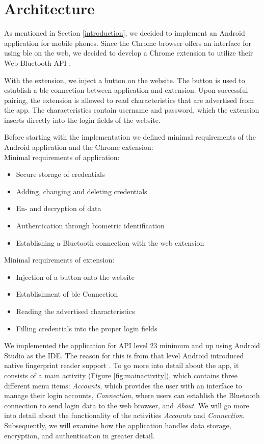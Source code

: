 \section{Architecture} \label{architecture}
As mentioned in Section \ref{introduction}, we decided to implement an Android application for mobile phones. Since the Chrome browser offers an interface for using \gls{ble} on the web, we decided to develop a Chrome extension to utilize their Web Bluetooth API \cite{WebBTAPI}.

With the extension, we inject a button on the website. The button is used to establish a \gls{ble} connection between application and extension. Upon successful pairing, the extension is allowed to read characteristics that are advertised from the app. The characteristics contain username and password, which the extension inserts directly into the login fields of the website.

\noindent Before starting with the implementation we defined minimal requirements of the Android application and the Chrome extension: \\

\noindent Minimal requirements of application:
\begin{itemize}
\item Secure storage of credentials
\item Adding, changing and deleting credentials
\item En- and decryption of data 
\item Authentication through biometric identification
\item Establishing a Bluetooth connection with the web extension
\end{itemize}
\vspace{0.3cm}
\noindent Minimal requirements of extension:
\begin{itemize}
\item Injection of a button onto the website
\item Establishment of \gls{ble} Connection
\item Reading the advertised characteristics
\item Filling credentials into the proper login fields
\end{itemize}


\noindent We implemented the application for API level 23 minimum and up using Android Studio as the IDE. The reason for this is from that level Android introduced native fingerprint reader support \cite{AndroidM}. To go more into detail about the app, it consists of a main activity (Figure \ref{fig:mainactivity}), which contains three different menu items: \textit{Accounts}, which provides the user with an interface to manage their login accounts, \textit{Connection}, where users can establish the Bluetooth connection to send login data to the web browser, and \textit{About}. We will go more into detail about the functionality of the activities \textit{Accounts} and \textit{Connection}. Subsequently, we will examine how the application handles data storage, encryption, and authentication in greater detail.

